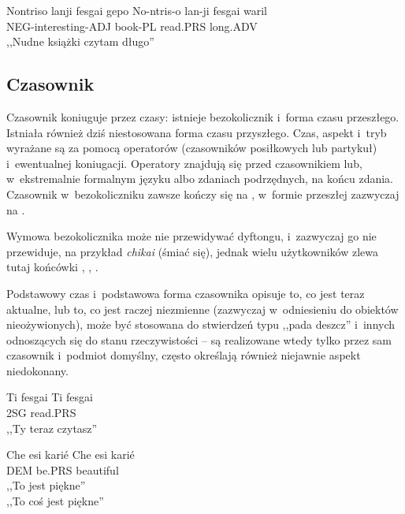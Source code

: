 \begin{spacing}{1.1}
\begin{exe}
	\ex
	\trans Nontriso lanji fesgai gepo
	\gll  No-ntris-o lan-ji fesgai waril\\
	  NEG-interesting-ADJ book-PL read.PRS long.ADV \\
	\glt  ,,Nudne książki czytam długo''
\end{exe}

\subsection{Czasownik}

Czasownik koniuguje przez czasy: istnieje bezokolicznik i~forma czasu
przeszłego. Istniała również dziś niestosowana forma czasu przyszłego. Czas,
aspekt i~tryb wyrażane są za pomocą operatorów (czasowników posiłkowych lub
partykuł) i~ewentualnej koniugacji. Operatory znajdują się przed czasownikiem
lub, w~ekstremalnie formalnym języku albo zdaniach podrzędnych, na końcu zdania.
Czasownik w~bezokoliczniku zawsze kończy się na , w~formie przeszłej
zazwyczaj na .

Wymowa bezokolicznika może nie przewidywać dyftongu, i~zazwyczaj go nie
przewiduje, na przykład \emph{chikai}  (śmiać się), jednak wielu
użytkowników zlewa tutaj końcówki , , .

\skipline

Podstawowy czas i~podstawowa forma czasownika opisuje to, co jest teraz
aktualne, lub to, co jest raczej niezmienne (zazwyczaj w~odniesieniu do obiektów
nieożywionych), może być stosowana do stwierdzeń typu ,,pada deszcz'' i~innych
odnoszących się do stanu rzeczywistości -- są realizowane wtedy tylko przez sam
czasownik i~podmiot domyślny, często określają również niejawnie aspekt
niedokonany.

\begin{exe}
	\ex
	\trans Ti fesgai
	\gll  Ti fesgai \\
	  2SG read.PRS \\
	\glt  ,,Ty teraz czytasz''
\end{exe}

\begin{exe}
	\ex
	\trans Che esi karié
	\gll  Che esi karié \\
	  DEM be.PRS beautiful \\
	\glt  ,,To jest piękne'' \\ ,,To coś jest piękne''
\end{exe}


\end{spacing}
